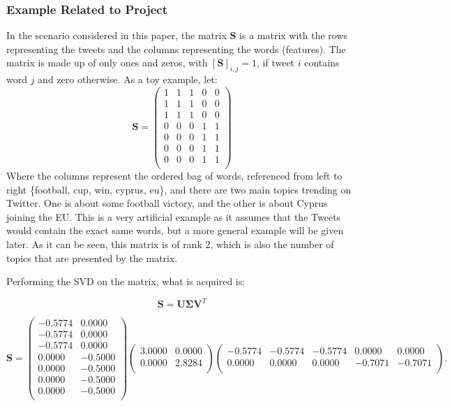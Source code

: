 \documentclass[11pt,a4paper]{article}
\begin{document}
\subsubsection{Example Related to Project}
In the scenario considered in this paper, the matrix $\mathbf{S}$ is a matrix with the rows representing the tweets and the columns representing the words (features). The matrix is made up of only ones and zeros, with $[\mathbf{S}]_{i,j} = 1$, if tweet $i$ contains word $j$ and zero otherwise. As a toy example, let:
\begin{equation}
\mathbf{S} = 
\begin{pmatrix}
1 & 1 & 1 & 0 & 0\\
1 & 1 & 1 & 0 & 0\\
1 & 1 & 1 & 0 & 0\\
0 & 0 & 0 & 1 & 1\\
0 & 0 & 0 & 1 & 1\\
0 & 0 & 0 & 1 & 1\\
0 & 0 & 0 & 1 & 1\\
\end{pmatrix}
\end{equation}
Where the columns represent the ordered bag of words, referenced from left to right \{football, cup, win, cyprus, eu\}, and there are two main topics trending on Twitter. One is about some football victory, and the other is about Cyprus joining the EU. This is a very artificial example as it assumes that the Tweets would contain the exact same words, but a more general example will be given later. As it can be seen, this matrix is of rank 2, which is also the number of topics that are presented by the matrix. 

Performing the SVD on the matrix, what is acquired is:

\begin{equation*}
\mathbf{S} = \mathbf{U}\mathbf{\Sigma}\mathbf{V}^T
\end{equation*}

\begin{equation}
\mathbf{S} = \begin{pmatrix}
-0.5774 & 0.0000\\
-0.5774 & 0.0000\\
-0.5774 & 0.0000\\
0.0000 & -0.5000\\
0.0000 & -0.5000\\
0.0000 & -0.5000\\
0.0000 & -0.5000\\
\end{pmatrix}
\begin{pmatrix}
3.0000 & 0.0000\\
0.0000 & 2.8284\\
\end{pmatrix}
\begin{pmatrix}
-0.5774 & -0.5774 & -0.5774 & 0.0000 & 0.0000 \\
0.0000 & 0.0000 & 0.0000 & -0.7071 & -0.7071\\
\end{pmatrix}.
\end{equation}
\end{document}
